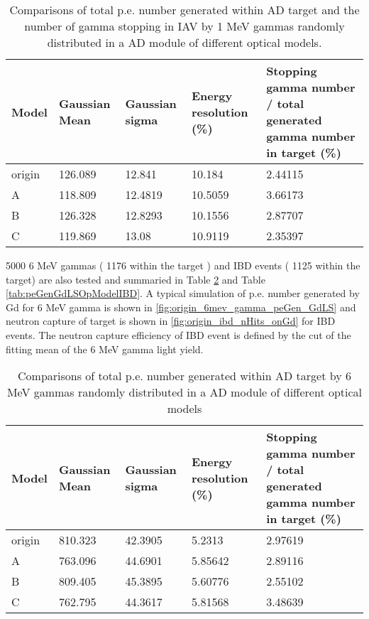 \begin{table}
\centering
\caption{Comparisons of total p.e. number generated within AD target
and the number of gamma stopping in IAV by 1 MeV gammas randomly distributed 
in a AD module of different optical models.}
\label{tab:peGenGdLSOpModel}
\begin{tabular}{lp{1.5cm}p{1.5cm}p{2.0cm}p{6.5cm}}
Model  &  Gaussian Mean  &  Gaussian sigma &     Energy resolution (\%) & Stopping gamma number / total generated gamma number in target (\%) \\
\hline
\hline
origin  & 126.089 & 12.841 & 10.184 & 2.44115\\
A       & 118.809 & 12.4819 & 10.5059 & 3.66173\\
B       & 126.328 & 12.8293 & 10.1556 & 2.87707\\
C       & 119.869 & 13.08 & 10.9119 & 2.35397 \\
\hline
\end{tabular}
\end{table}


5000 6 MeV gammas ( 1176 within the target ) and IBD events ( 1125 within the target) are also tested and summaried in Table \ref{tab:peGenGdLSOpModel6mevGamma} and Table \ref{tab:peGenGdLSOpModelIBD}.
A typical simulation of p.e. number generated by Gd for 6 MeV gamma is shown in \ref{fig:origin_6mev_gamma_peGen_GdLS} and
neutron capture of target is shown in \ref{fig:origin_ibd_nHits_onGd} for IBD events.
The neutron capture efficiency of IBD event is defined by the cut of the fitting mean of the 6 MeV gamma light yield.

\begin{table}
\centering
\caption{Comparisons of total p.e. number generated within AD target by 6 MeV gammas randomly distributed
in a AD module of different optical models}
\label{tab:peGenGdLSOpModel6mevGamma}
\begin{tabular}{lp{1.5cm}p{1.5cm}p{2.0cm}p{6.5cm}}
Model  &  Gaussian Mean  &  Gaussian sigma &     Energy resolution (\%) & Stopping gamma number / total generated gamma number in target (\%) \\
\hline
\hline
origin  & 810.323 & 42.3905 & 5.2313 & 2.97619 \\
A       & 763.096 & 44.6901 & 5.85642 & 2.89116 \\
B       & 809.405 & 45.3895 & 5.60776 & 2.55102 \\
C       & 762.795 & 44.3617 & 5.81568 & 3.48639 \\
\hline
\end{tabular}
\end{table}


